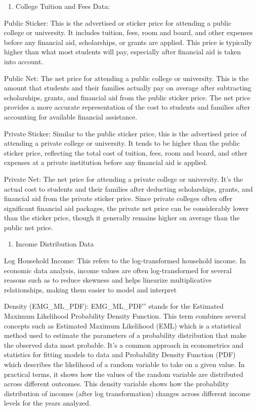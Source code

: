\documentclass[
  letterpaper,
  DIV=11,
  numbers=noendperiod]{scrartcl}
\providecommand{\tightlist}{%
  \setlength{\itemsep}{0pt}\setlength{\parskip}{0pt}}\usepackage{longtable,booktabs,array}
\begin{document}
\begin{enumerate}
\def\labelenumi{\arabic{enumi}.}
\setcounter{enumi}{3}
\tightlist
\item
  College Tuition and Fees Data:
\end{enumerate}

Public Sticker: This is the advertised or sticker price for attending a
public college or university. It includes tuition, fees, room and board,
and other expenses before any financial aid, scholarships, or grants are
applied. This price is typically higher than what most students will
pay, especially after financial aid is taken into account.

Public Net: The net price for attending a public college or university.
This is the amount that students and their families actually pay on
average after subtracting scholarships, grants, and financial aid from
the public sticker price. The net price provides a more accurate
representation of the cost to students and families after accounting for
available financial assistance.

Private Sticker: Similar to the public sticker price, this is the
advertised price of attending a private college or university. It tends
to be higher than the public sticker price, reflecting the total cost of
tuition, fees, room and board, and other expenses at a private
institution before any financial aid is applied.

Private Net: The net price for attending a private college or
university. It's the actual cost to students and their families after
deducting scholarships, grants, and financial aid from the private
sticker price. Since private colleges often offer significant financial
aid packages, the private net price can be considerably lower than the
sticker price, though it generally remains higher on average than the
public net price.

\begin{enumerate}
\def\labelenumi{\arabic{enumi}.}
\setcounter{enumi}{4}
\tightlist
\item
  Income Distribution Data
\end{enumerate}

Log Household Income: This refers to the log-transformed household
income. In economic data analysis, income values are often
log-transformed for several reasons such as to reduce skewness and helps
linearize multiplicative relationships, making them easier to model and
interpret

Density (EMG\_ML\_PDF): EMG\_ML\_PDF'' stands for the Estimated Maximum
Likelihood Probability Density Function. This term combines several
concepts such as Estimated Maximum Likelihood (EML) which is a
statistical method used to estimate the parameters of a probability
distribution that make the observed data most probable. It's a common
approach in econometrics and statistics for fitting models to data and
Probability Density Function (PDF) which describes the likelihood of a
random variable to take on a given value. In practical terms, it shows
how the values of the random variable are distributed across different
outcomes. This density variable shows how the probability distribution
of incomes (after log transformation) changes across different income
levels for the years analyzed.
\end{document}
